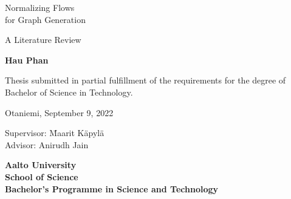 {\parindent0pt %
	\begin{spacing}{1.1}

		 {\sffamily\lsstyle \the\year}
	\end{spacing}

	\vspace{12.7mm}

	\begin{spacing}{1.63}
		{\fontsize{17.8pt}{17.8pt}\selectfont Normalizing Flows \\for Graph Generation}
	\end{spacing}

	\vspace{10.5mm}

	\begin{spacing}{1.2}
		{\fontsize{13pt}{13pt}\selectfont A Literature Review}
	\end{spacing}

	\vspace{10.6mm}

	{\fontsize{13.9pt}{13.9pt}\bfseries\sffamily\lsstyle Hau Phan}

	\vfill

	{\fontsize{10.3pt}{10.3pt}\sffamily\lsstyle\raggedright
		\begin{spacing}{1.06}

			Thesis submitted in partial fulfillment of the requirements for the
			degree of Bachelor of Science in Technology.

			Otaniemi, September 9, 2022

			\begin{tabbing}
				Supervisor:\hspace{6mm} \= Maarit Käpylä \\
				Advisor: \> Anirudh Jain
			\end{tabbing}
			\vspace{-4mm}
		\end{spacing}
	} %

	\vspace{11.5mm}

	\begin{spacing}{.9}
		{\bfseries\sffamily\lsstyle Aalto University \\
			School of Science \\
			Bachelor’s Programme in Science and Technology}
	\end{spacing}
} %



